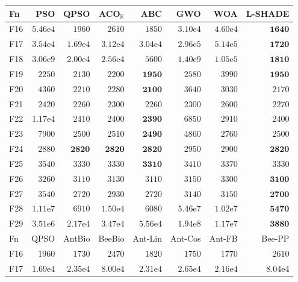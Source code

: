 \begin{tabular}{lrrrrrrr}
\toprule
Fn & PSO & QPSO & ACO$_\mathbb{R}$ & ABC & GWO & WOA & L-SHADE \\
\midrule
F16 & $5.46\mathrm{e}{4}$ & $1960$ & $2610$ & $1850$ & $3.10\mathrm{e}{4}$ & $4.60\mathrm{e}{4}$ & $\mathbf{1640}$ \\
F17 & $3.54\mathrm{e}{4}$ & $1.69\mathrm{e}{4}$ & $3.12\mathrm{e}{4}$ & $3.04\mathrm{e}{4}$ & $2.96\mathrm{e}{5}$ & $5.14\mathrm{e}{5}$ & $\mathbf{1720}$ \\
F18 & $3.06\mathrm{e}{9}$ & $2.00\mathrm{e}{4}$ & $2.56\mathrm{e}{4}$ & $5600$ & $1.40\mathrm{e}{9}$ & $1.05\mathrm{e}{5}$ & $\mathbf{1810}$ \\
F19 & $2250$ & $2130$ & $2200$ & $\mathbf{1950}$ & $2580$ & $3990$ & $\mathbf{1950}$ \\
F20 & $4360$ & $2210$ & $2280$ & $\mathbf{2100}$ & $3640$ & $3030$ & $2170$ \\
F21 & $2420$ & $2260$ & $2300$ & $2260$ & $2300$ & $2600$ & $2270$ \\
F22 & $1.17\mathrm{e}{4}$ & $2410$ & $2400$ & $\mathbf{2390}$ & $6850$ & $2910$ & $2400$ \\
F23 & $7900$ & $2500$ & $2510$ & $\mathbf{2490}$ & $4860$ & $2760$ & $2500$ \\
F24 & $2880$ & $\mathbf{2820}$ & $\mathbf{2820}$ & $\mathbf{2820}$ & $2950$ & $2900$ & $\mathbf{2820}$ \\
F25 & $3540$ & $3330$ & $3330$ & $\mathbf{3310}$ & $3410$ & $3370$ & $3330$ \\
F26 & $3260$ & $3110$ & $3130$ & $3110$ & $3150$ & $3300$ & $\mathbf{3100}$ \\
F27 & $3540$ & $2720$ & $2930$ & $2720$ & $3140$ & $3150$ & $\mathbf{2700}$ \\
F28 & $1.11\mathrm{e}{7}$ & $6910$ & $1.50\mathrm{e}{4}$ & $6080$ & $5.46\mathrm{e}{7}$ & $1.02\mathrm{e}{7}$ & $\mathbf{5470}$ \\
F29 & $3.51\mathrm{e}{6}$ & $2.17\mathrm{e}{4}$ & $3.47\mathrm{e}{4}$ & $5.56\mathrm{e}{4}$ & $1.94\mathrm{e}{8}$ & $1.17\mathrm{e}{7}$ & $\mathbf{3880}$ \\
\midrule
Fn & QPSO & AntBio & BeeBio & Ant-Lin & Ant-Cos & Ant-FB & Bee-PP \\
\midrule
F16 & $1960$ & $1730$ & $2470$ & $1820$ & $1750$ & $1770$ & $2610$ \\
F17 & $1.69\mathrm{e}{4}$ & $2.35\mathrm{e}{4}$ & $8.00\mathrm{e}{4}$ & $2.31\mathrm{e}{4}$ & $2.65\mathrm{e}{4}$ & $2.16\mathrm{e}{4}$ & $8.04\mathrm{e}{4}$ \\

\end{tabular}

